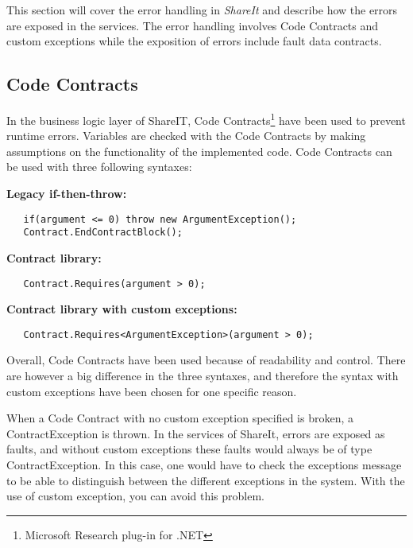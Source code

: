 \documentclass[../report.tex]{subfiles}
\begin{document}
This section will cover the error handling in \textit{ShareIt} and describe how the errors are exposed in the services. The error handling involves Code Contracts and custom exceptions while the exposition of errors include fault data contracts.

\subsection{Code Contracts}


In the business logic layer of ShareIT, Code Contracts\footnote{Microsoft Research plug-in for .NET} have been used to prevent runtime errors. Variables are checked with the Code Contracts by making assumptions on the functionality of the implemented code. Code Contracts can be used with three following syntaxes:

 \textbf{Legacy if-then-throw:}
\begin{lstlisting}
   if(argument <= 0) throw new ArgumentException();  
   Contract.EndContractBlock();
\end{lstlisting}

\textbf{Contract library:}
\begin{lstlisting}
   Contract.Requires(argument > 0);
\end{lstlisting}

\textbf{Contract library with custom exceptions:}
\begin{lstlisting}
   Contract.Requires<ArgumentException>(argument > 0);
\end{lstlisting}

Overall, Code Contracts have been used because of readability and control. There are however a big difference in the three syntaxes, and therefore the syntax with custom exceptions have been chosen for one specific reason. 

When a Code Contract with no custom exception specified is broken, a ContractException is thrown. In the services of ShareIt, errors are exposed as faults, and without custom exceptions these faults would always be of type ContractException. In this case, one would have to check the exceptions message to be able to distinguish between the different exceptions in the system. With the use of custom exception, you can avoid this problem. 
\end{document}
